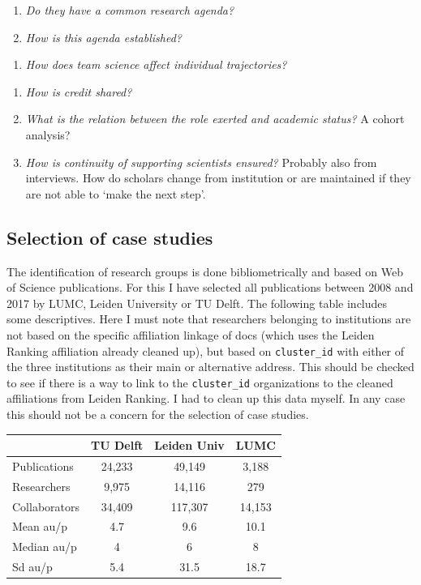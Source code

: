 \documentclass[]{elsarticle} %
\providecommand{\tightlist}{%
  \setlength{\itemsep}{0pt}\setlength{\parskip}{0pt}}
\begin{document}
\begin{enumerate}
\def\labelenumi{\roman{enumi}.}
\tightlist
\item
  \emph{Do they have a common research agenda?}
\item
  \emph{How is this agenda established?}
\end{enumerate}

\begin{enumerate}
\def\labelenumi{\arabic{enumi}.}
\setcounter{enumi}{2}
\tightlist
\item
  \emph{How does team science affect individual trajectories?}
\end{enumerate}

\begin{enumerate}
\def\labelenumi{\roman{enumi}.}
\tightlist
\item
  \emph{How is credit shared?}
\item
  \emph{What is the relation between the role exerted and academic
  status?} A cohort analysis?
\item
  \emph{How is continuity of supporting scientists ensured?} Probably
  also from interviews. How do scholars change from institution or are
  maintained if they are not able to `make the next step'.
\end{enumerate}

\hypertarget{selection-of-case-studies}{%
\subsection{Selection of case studies}\label{selection-of-case-studies}}

The identification of research groups is done bibliometrically and based
on Web of Science publications. For this I have selected all
publications between 2008 and 2017 by LUMC, Leiden University or TU
Delft. The following table includes some descriptives. Here I must note
that researchers belonging to institutions are not based on the specific
affiliation linkage of docs (which uses the Leiden Ranking affiliation
already cleaned up), but based on \texttt{cluster\_id} with either of
the three institutions as their main or alternative address. This should
be checked to see if there is a way to link to the \texttt{cluster\_id}
organizations to the cleaned affiliations from Leiden Ranking. I had to
clean up this data myself. In any case this should not be a concern for
the selection of case studies.

\begin{longtable}[]{@{}lccc@{}}
\toprule
& TU Delft & Leiden Univ & LUMC\tabularnewline
\midrule
\endhead
Publications & 24,233 & 49,149 & 3,188\tabularnewline
Researchers & 9,975 & 14,116 & 279\tabularnewline
Collaborators & 34,409 & 117,307 & 14,153\tabularnewline
Mean au/p & 4.7 & 9.6 & 10.1\tabularnewline
Median au/p & 4 & 6 & 8\tabularnewline
Sd au/p & 5.4 & 31.5 & 18.7\tabularnewline
\bottomrule
\end{longtable}
\end{document}
